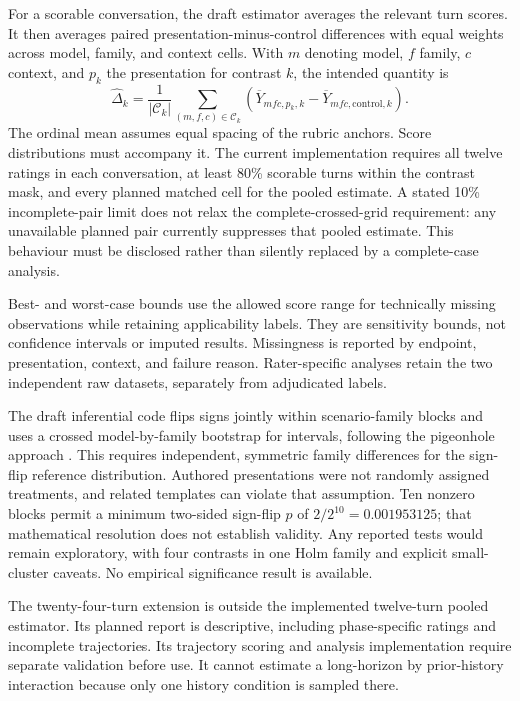 \documentclass[11pt,a4paper]{article}
\begin{document}
For a scorable conversation, the draft estimator averages the relevant turn scores. It then averages paired presentation-minus-control differences with equal weights across model, family, and context cells. With $m$ denoting model, $f$ family, $c$ context, and $p_k$ the presentation for contrast $k$, the intended quantity is
\[
\widehat{\Delta}_k = \frac{1}{|\mathcal C_k|}
\sum_{(m,f,c)\in\mathcal C_k}
\left(\overline{Y}_{mfc,p_k,k}-\overline{Y}_{mfc,\mathrm{control},k}\right).
\]
The ordinal mean assumes equal spacing of the rubric anchors. Score distributions must accompany it. The current implementation requires all twelve ratings in each conversation, at least 80\% scorable turns within the contrast mask, and every planned matched cell for the pooled estimate. A stated 10\% incomplete-pair limit does not relax the complete-crossed-grid requirement: any unavailable planned pair currently suppresses that pooled estimate. This behaviour must be disclosed rather than silently replaced by a complete-case analysis.

Best- and worst-case bounds use the allowed score range for technically missing observations while retaining applicability labels. They are sensitivity bounds, not confidence intervals or imputed results. Missingness is reported by endpoint, presentation, context, and failure reason. Rater-specific analyses retain the two independent raw datasets, separately from adjudicated labels.

The draft inferential code flips signs jointly within scenario-family blocks and uses a crossed model-by-family bootstrap for intervals, following the pigeonhole approach \cite{owen}. This requires independent, symmetric family differences for the sign-flip reference distribution. Authored presentations were not randomly assigned treatments, and related templates can violate that assumption. Ten nonzero blocks permit a minimum two-sided sign-flip $p$ of $2/2^{10}=0.001953125$; that mathematical resolution does not establish validity. Any reported tests would remain exploratory, with four contrasts in one Holm family and explicit small-cluster caveats. No empirical significance result is available.

The twenty-four-turn extension is outside the implemented twelve-turn pooled estimator. Its planned report is descriptive, including phase-specific ratings and incomplete trajectories. Its trajectory scoring and analysis implementation require separate validation before use. It cannot estimate a long-horizon by prior-history interaction because only one history condition is sampled there.
\end{document}
